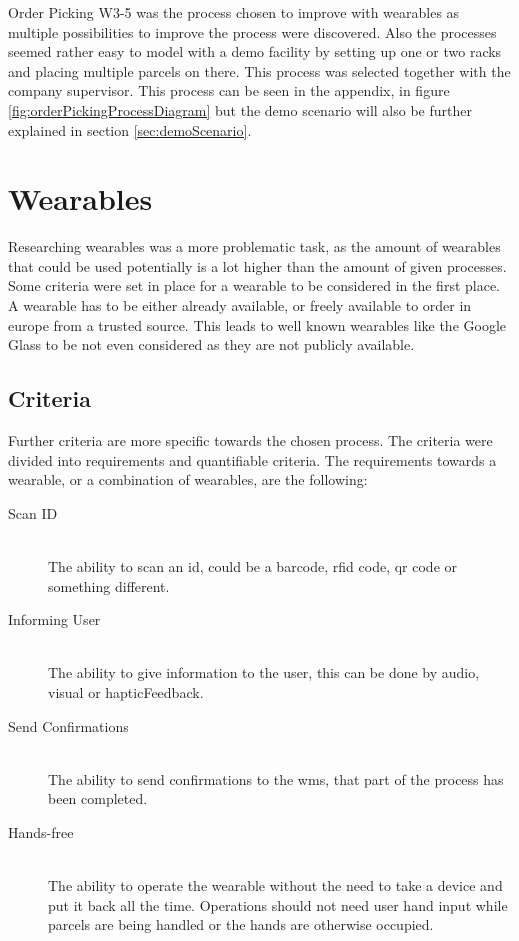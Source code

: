 Order Picking W3-5 was the process chosen to improve with wearables as multiple possibilities to improve the process were discovered. Also the processes seemed rather easy to model with a demo facility by setting up one or two racks and placing multiple \gls{parcel}s on there. This process was selected together with the company supervisor. This process can be seen in the appendix, in figure \ref{fig:orderPickingProcessDiagram} but the demo scenario will also be further explained in section \ref{sec:demoScenario}.

\section{Wearables}\label{sec:wearables}
Researching wearables was a more problematic task, as the amount of wearables that could be used potentially is a lot higher than the amount of given processes. Some criteria were set in place for a wearable to be considered in the first place. A wearable has to be either already available, or freely available to order in europe from a trusted source. This leads to well known wearables like the Google Glass to be not even considered as they are not publicly available.

\subsection{Criteria}

Further criteria are more specific towards the chosen process. The criteria were divided into requirements and quantifiable criteria. The requirements towards a wearable, or a combination of wearables, are the following:
\begin{description}
	\item[Scan ID] \hfill \\
		The ability to scan an \gls{id}, could be a barcode, \gls{rfid} code, \gls{qr} code or something different.
	\item[Informing User] \hfill \\
		The ability to give information to the user, this can be done by audio, visual or \gls{hapticFeedback}. 
	\item[Send Confirmations] \hfill \\
		The ability to send confirmations to the \gls{wms}, that part of the process has been completed.
	\item[Hands-free] \hfill \\
		The ability to operate the wearable without the need to take a device and put it back all the time. Operations should not need user hand input while \gls{parcel}s are being handled or the hands are otherwise occupied.
\end{description}

